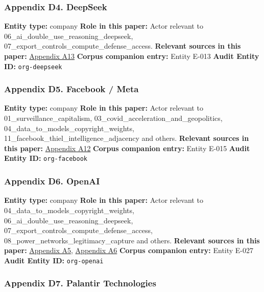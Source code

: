 \documentclass[
  american,
  11pt,
  letterpaper,
]{article}
\begin{document}
\subsubsection{Appendix D4. DeepSeek}\label{ch-07-appendix-d4-deepseek}

\textbf{Entity type:} company \textbf{Role in this paper:} Actor
relevant to 06\_ai\_double\_use\_reasoning\_deepseek,
07\_export\_controls\_compute\_defense\_access. \textbf{Relevant sources
in this paper:}
\hyperref[ch-07-appendix-a13-deepseek-r1-incentivizing-reasoning-capability-in-llms-via-reinforcement-learning]{Appendix
A13} \textbf{Corpus companion entry:} Entity E-013 \textbf{Audit Entity
ID:} \texttt{org-deepseek}

\subsubsection{Appendix D5. Facebook /
Meta}\label{ch-07-appendix-d5-facebook-meta}

\textbf{Entity type:} company \textbf{Role in this paper:} Actor
relevant to 01\_surveillance\_capitalism,
03\_covid\_acceleration\_and\_geopolitics,
04\_data\_to\_models\_copyright\_weights,
11\_facebook\_thiel\_intelligence\_adjacency and others.
\textbf{Relevant sources in this paper:}
\hyperref[ch-07-appendix-a12-meta-platforms-inc-2022-definitive-proxy-statement]{Appendix
A12} \textbf{Corpus companion entry:} Entity E-015 \textbf{Audit Entity
ID:} \texttt{org-facebook}

\subsubsection{Appendix D6. OpenAI}\label{ch-07-appendix-d6-openai}

\textbf{Entity type:} company \textbf{Role in this paper:} Actor
relevant to 04\_data\_to\_models\_copyright\_weights,
06\_ai\_double\_use\_reasoning\_deepseek,
07\_export\_controls\_compute\_defense\_access,
08\_power\_networks\_legitimacy\_capture and others. \textbf{Relevant
sources in this paper:}
\hyperref[ch-07-appendix-a5-openais-proposals-for-the-us-ai-action-plan]{Appendix
A5},
\hyperref[ch-07-appendix-a6-introducing-openai-for-government]{Appendix
A6} \textbf{Corpus companion entry:} Entity E-027 \textbf{Audit Entity
ID:} \texttt{org-openai}

\subsubsection{Appendix D7. Palantir
Technologies}\label{ch-07-appendix-d7-palantir-technologies}
\end{document}
